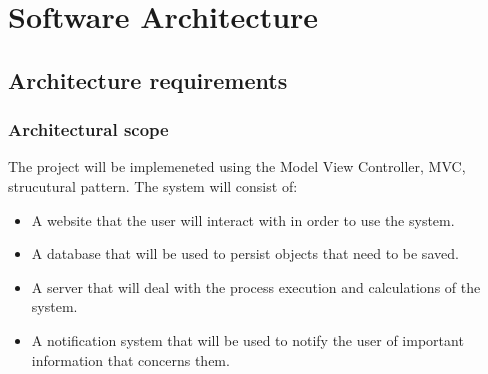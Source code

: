 \documentclass[a4paper,12pt]{article}
\begin{document}
\section{Software Architecture}
\subsection{Architecture requirements}
\subsubsection{Architectural scope}
The project will be implemeneted using the Model View Controller, MVC, strucutural pattern.
The system will consist of:\begin{itemize}
	\item A website that the user will interact with in order to use the system.
	\item A database that will be used to persist objects that need to be saved.
	\item A server that will deal with the process execution and calculations of the system.
	\item A notification system that will be used to notify the user of important information that concerns them.
\end{itemize}
\end{document}
